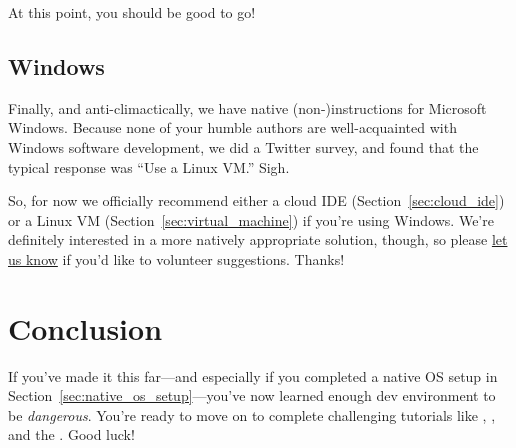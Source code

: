 At this point, you should be good to go!


\subsection{Windows} %
\label{sec:windows}

Finally, and anti-climactically, we have native (non-)instructions for Microsoft Windows. Because none of your humble authors are well-acquainted with Windows software development, we did a Twitter survey, and found that the typical response was ``Use a Linux VM\@.'' Sigh.

So, for now we officially recommend either a cloud IDE (Section~\ref{sec:cloud_ide}) or a Linux VM (Section~\ref{sec:virtual_machine}) if you're using Windows. We're definitely interested in a more natively appropriate solution, though, so please \href{mailto:support@learnenough.com}{let us know} if you'd like to volunteer suggestions. Thanks!



\section{Conclusion} %
\label{sec:conclusion}

If you've made it this far---and especially if you completed a native OS setup in Section~\ref{sec:native_os_setup}---you've now learned enough dev environment to be \emph{dangerous}. You're ready to move on to complete challenging tutorials like \lecss, \ler, and the \rort. Good luck!


\bigskip

